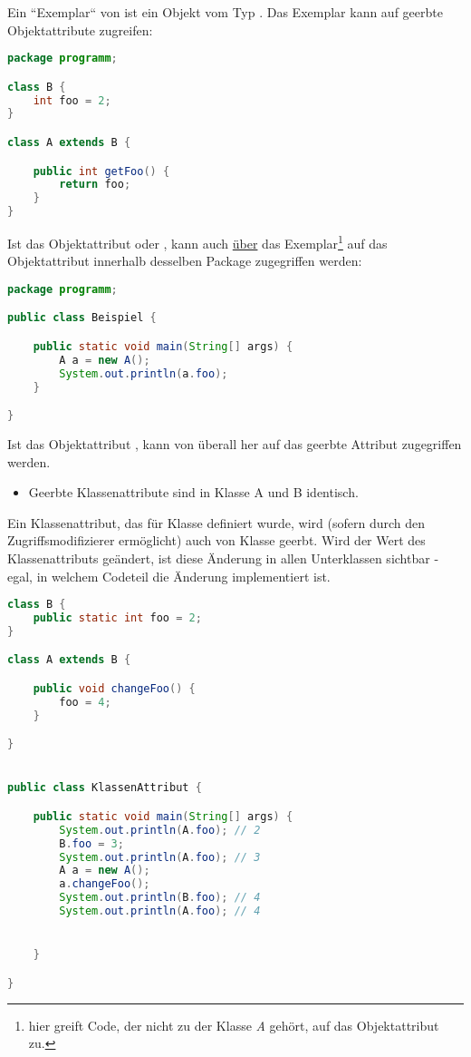 Ein ``Exemplar`` von  ist ein Objekt vom Typ .
Das Exemplar kann auf geerbte Objektattribute zugreifen:

\begin{lstlisting}[language=java]
package programm;

class B {
    int foo = 2;
}

class A extends B {

    public int getFoo() {
        return foo;
    }
}
\end{lstlisting}


Ist das Objektattribut  oder , kann auch \underline{über} das Exemplar\footnote{
hier greift Code, der nicht zu der Klasse \textit{A} gehört, auf das Objektattribut zu.
} auf das Objektattribut
innerhalb desselben Package zugegriffen werden:

\begin{lstlisting}[language=java]
package programm;

public class Beispiel {

    public static void main(String[] args) {
        A a = new A();
        System.out.println(a.foo);
    }

}
\end{lstlisting}

Ist das Objektattribut , kann von überall her auf das geerbte Attribut zugegriffen werden.


\begin{itemize}
    \item Geerbte Klassenattribute sind in Klasse A und B identisch.
\end{itemize}

Ein Klassenattribut, das für Klasse  definiert wurde, wird (sofern durch den Zugriffsmodifizierer ermöglicht) auch von Klasse  geerbt.
Wird der Wert des Klassenattributs geändert, ist diese Änderung in allen Unterklassen sichtbar - egal, in welchem Codeteil die Änderung
implementiert ist.


\begin{lstlisting}[language=java]
class B {
    public static int foo = 2;
}

class A extends B {

    public void changeFoo() {
        foo = 4;
    }

}


public class KlassenAttribut {

    public static void main(String[] args) {
        System.out.println(A.foo); // 2
        B.foo = 3;
        System.out.println(A.foo); // 3
        A a = new A();
        a.changeFoo();
        System.out.println(B.foo); // 4
        System.out.println(A.foo); // 4


    }

}
\end{lstlisting}

